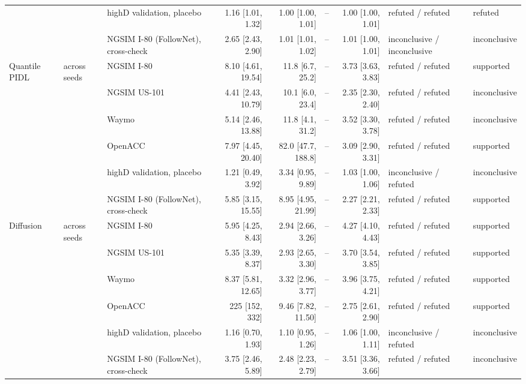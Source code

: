 \begin{longtable}{lllrrrrll}
 &  & highD validation, placebo & 1.16 [1.01, 1.32] & 1.00 [1.00, 1.01] & -- & 1.00 [1.00, 1.01] & refuted / refuted & refuted \\
 &  & NGSIM I-80 (FollowNet), cross-check & 2.65 [2.43, 2.90] & 1.01 [1.01, 1.02] & -- & 1.01 [1.00, 1.01] & inconclusive / inconclusive & inconclusive \\
\midrule
Quantile PIDL & across seeds & NGSIM I-80 & 8.10 [4.61, 19.54] & 11.8 [6.7, 25.2] & -- & 3.73 [3.63, 3.83] & refuted / refuted & supported \\
 &  & NGSIM US-101 & 4.41 [2.43, 10.79] & 10.1 [6.0, 23.4] & -- & 2.35 [2.30, 2.40] & refuted / refuted & inconclusive \\
 &  & Waymo & 5.14 [2.46, 13.88] & 11.8 [4.1, 31.2] & -- & 3.52 [3.30, 3.78] & refuted / refuted & inconclusive \\
 &  & OpenACC & 7.97 [4.45, 20.40] & 82.0 [47.7, 188.8] & -- & 3.09 [2.90, 3.31] & refuted / refuted & supported \\
 &  & highD validation, placebo & 1.21 [0.49, 3.92] & 3.34 [0.95, 9.89] & -- & 1.03 [1.00, 1.06] & inconclusive / refuted & inconclusive \\
 &  & NGSIM I-80 (FollowNet), cross-check & 5.85 [3.15, 15.55] & 8.95 [4.95, 21.99] & -- & 2.27 [2.21, 2.33] & refuted / refuted & supported \\
\midrule
Diffusion & across seeds & NGSIM I-80 & 5.95 [4.25, 8.43] & 2.94 [2.66, 3.26] & -- & 4.27 [4.10, 4.43] & refuted / refuted & supported \\
 &  & NGSIM US-101 & 5.35 [3.39, 8.37] & 2.93 [2.65, 3.30] & -- & 3.70 [3.54, 3.85] & refuted / refuted & supported \\
 &  & Waymo & 8.37 [5.81, 12.65] & 3.32 [2.96, 3.77] & -- & 3.96 [3.75, 4.21] & refuted / refuted & supported \\
 &  & OpenACC & 225 [152, 332] & 9.46 [7.82, 11.50] & -- & 2.75 [2.61, 2.90] & refuted / refuted & supported \\
 &  & highD validation, placebo & 1.16 [0.70, 1.93] & 1.10 [0.95, 1.26] & -- & 1.06 [1.00, 1.11] & inconclusive / refuted & inconclusive \\
 &  & NGSIM I-80 (FollowNet), cross-check & 3.75 [2.46, 5.89] & 2.48 [2.23, 2.79] & -- & 3.51 [3.36, 3.66] & refuted / refuted & inconclusive \\
\end{longtable}
\endgroup
